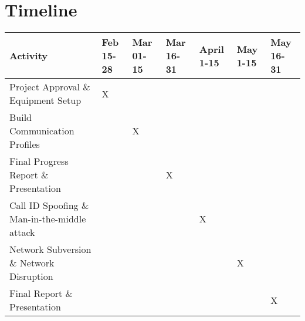 \section{Timeline}
		\vspace{3px}
    	\setlength{\arrayrulewidth}{0.5mm}
  		\setlength{\tabcolsep}{7pt}
  		\renewcommand{\arraystretch}{2}
 

		\begin{center}
		\small

		\begin{tabular}		{|m{3cm}|m{0.5cm}|m{0.5cm}|m{0.5cm}|m{0.5cm}|m{0.5cm}|m{0.5cm}|}
		\hline
		Activity & Feb 15-28 & Mar 01-15 & Mar 16-31 & April 1-15 & May 1-15 & May 16-31\\
		\hline
		Project Approval \& Equipment Setup & X & & & & & \\
		\hline
		Build Communication Profiles & & X & & & & \\
		\hline
		Final Progress Report \& Presentation & & & X & & &  \\
		\hline
		Call ID Spoofing \& Man-in-the-middle attack & & & & X & &\\
		\hline
		Network Subversion \& Network Disruption & & & & & X &\\
		\hline
		Final Report \& Presentation & & & & & & X\\
		\hline
		\end{tabular}
		\end{center}

